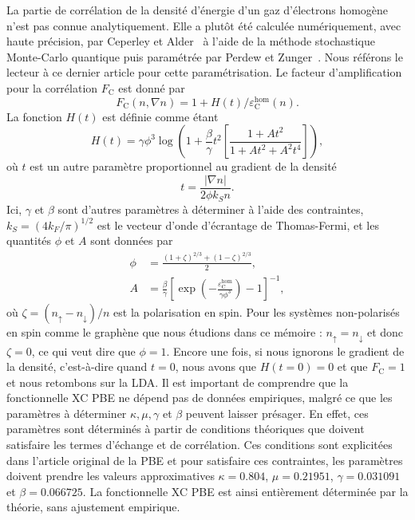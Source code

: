 La partie de corrélation de la densité d'énergie d'un gaz d'électrons homogène n'est pas connue analytiquement. Elle a plutôt été calculée numériquement, avec haute précision, par Ceperley et Alder~\cite{ceperleyGroundStateElectron1980} à l'aide de la méthode stochastique Monte-Carlo quantique puis paramétrée par Perdew et Zunger~\cite{perdewSelfinteractionCorrectionDensityfunctional1981}. Nous référons le lecteur à ce dernier article pour cette paramétrisation. Le facteur d'amplification pour la corrélation $F_\text{C}$ est donné par
\begin{equation}
    \label{eqn:a1_FC}
    F_\text{C}(n,\nabla n) = 1+H(t)/\varepsilon_\text{C}^\text{hom}(n).
\end{equation}
La fonction $H(t)$ est définie comme étant
\begin{equation}
    H(t) = \gamma\phi^3\log\left(1+\frac{\beta}{\gamma}t^2\left[\frac{1+At^2}{1+At^2+A^2t^4}\right]\right),
    \label{eqn:a1_Ht}
\end{equation}
où $t$ est un autre paramètre proportionnel au gradient de la densité
\begin{equation}
    t = \frac{|\nabla n|}{2\phi k_Sn}.
\end{equation}
Ici, $\gamma$ et $\beta$ sont d'autres paramètres à déterminer à l'aide des contraintes, $k_S=(4k_F/\pi)^{1/2}$ est le vecteur d'onde d'écrantage de Thomas-Fermi, et les quantités $\phi$ et $A$ sont données par
\begin{align}
    \phi &= \frac{(1+\zeta)^{2/3}+(1-\zeta)^{2/3}}{2},\\
    A &= \frac{\beta}{\gamma}\left[\exp\left(-\frac{\varepsilon_\text{C}^\text{hom}}{\gamma\phi^3}\right)-1\right]^{-1},
\end{align}
où $\zeta=(n_\uparrow-n_\downarrow)/n$ est la polarisation en spin. Pour les systèmes non-polarisés en spin comme le graphène que nous étudions dans ce mémoire : $n_\uparrow = n_\downarrow$ et donc $\zeta=0$, ce qui veut dire que $\phi=1$. Encore une fois, si nous ignorons le gradient de la densité, c'est-à-dire quand $t=0$, nous avons que $H(t=0)=0$ et que $F_\text{C}=1$ et nous retombons sur la LDA. Il est important de comprendre que la fonctionnelle XC PBE ne dépend pas de données empiriques, malgré ce que les paramètres à déterminer $\kappa, \mu,\gamma$ et $\beta$ peuvent laisser présager. En effet, ces paramètres sont déterminés à partir de conditions théoriques que doivent satisfaire les termes d'échange et de corrélation. Ces conditions sont explicitées dans l'article original de la PBE \cite{perdewGeneralizedGradientApproximation1996a} et pour satisfaire ces contraintes, les paramètres doivent prendre les valeurs approximatives $\kappa=0.804$, $\mu=0.21951$, $\gamma=0.031091$ et $\beta=0.066725$. La fonctionnelle XC PBE est ainsi entièrement déterminée par la théorie, sans ajustement empirique.
